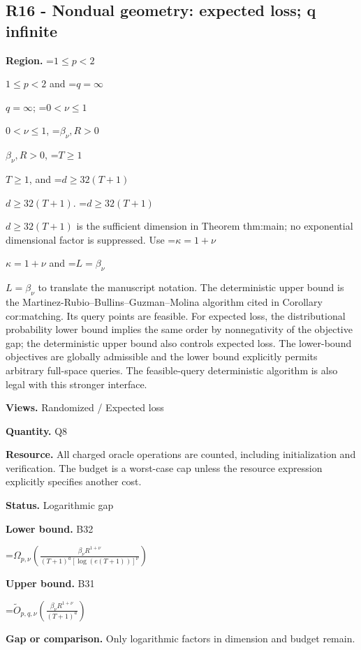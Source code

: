 \documentclass[10pt,a4paper]{article}
\newcommand{\AtlasMath}[1]{\par\begingroup\centering\setbox0=\hbox{$\displaystyle #1$}\ifdim\wd0>1.4\linewidth\typeout{ATLAS WIDE FORMULA: \the\wd0}\fi\ifdim\wd0>\linewidth\resizebox{\linewidth}{!}{\box0}\else\box0\fi\par\endgroup}
\newcommand{\AtlasInlineMath}[1]{\begingroup\setbox0=\hbox{$#1$}\ifdim\wd0>.4\linewidth\endgroup\AtlasMath{#1}\else\endgroup$#1$\fi}
\begin{document}
\subsection{R16 - Nondual geometry: expected loss; q infinite}


\textbf{Region.} \AtlasInlineMath{1\le p<2} and \AtlasInlineMath{q=\infty}; \AtlasInlineMath{0<\nu\le1}, \AtlasInlineMath{\beta_\nu,R>0}, \AtlasInlineMath{T\ge1}, and \AtlasInlineMath{d\ge32(T+1)}. \AtlasInlineMath{d\ge32(T+1)} is the sufficient dimension in Theorem thm:main; no exponential dimensional factor is suppressed. Use \AtlasInlineMath{\kappa=1+\nu} and \AtlasInlineMath{L=\beta_\nu} to translate the manuscript notation. The deterministic upper bound is the Martinez-Rubio--Bullins--Guzman--Molina algorithm cited in Corollary cor:matching. Its query points are feasible. For expected loss, the distributional probability lower bound implies the same order by nonnegativity of the objective gap; the deterministic upper bound also controls expected loss. The lower-bound objectives are globally admissible and the lower bound explicitly permits arbitrary full-space queries. The feasible-query deterministic algorithm is also legal with this stronger interface.



\textbf{Views.} Randomized / Expected loss



\textbf{Quantity.} Q8



\textbf{Resource.} All charged oracle operations are counted, including initialization and verification. The budget is a worst-case cap unless the resource expression explicitly specifies another cost.



\textbf{Status.} Logarithmic gap



\textbf{Lower bound.} B32



\AtlasMath{\Omega_{p,\nu}\!\left(\frac{\beta_\nu R^{1+\nu}}{(T+1)^a[\log(e(T+1))]^\nu}\right)}


\textbf{Upper bound.} B31



\AtlasMath{\widetilde O_{p,q,\nu}\!\left(\frac{\beta_\nu R^{1+\nu}}{(T+1)^a}\right)}


\textbf{Gap or comparison.} Only logarithmic factors in dimension and budget remain.
\end{document}
